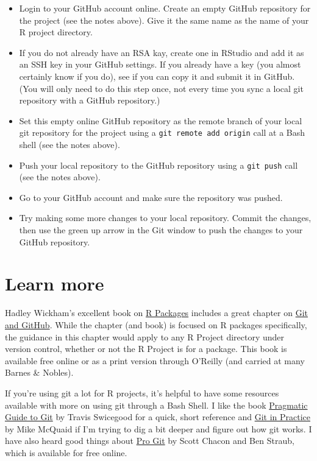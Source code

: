 \documentclass[]{tufte-book}
\providecommand{\tightlist}{%
  \setlength{\itemsep}{0pt}\setlength{\parskip}{0pt}}
\begin{document}
\begin{itemize}
\tightlist
\item
  Login to your GitHub account online. Create an empty GitHub repository for the
  project (see the notes above). Give it the same name as the name of your R project directory.
\item
  If you do not already have an RSA kay, create one in RStudio and add it as an
  SSH key in your GitHub settings. If you already have a key (you almost certainly
  know if you do), see if you can copy it and submit it in GitHub. (You will only need
  to do this step once, not every time you sync a local git repository with a GitHub
  repository.)
\item
  Set this empty online GitHub repository as the remote branch of your local git
  repository for the project using a \texttt{git\ remote\ add\ origin} call at a Bash shell
  (see the notes above).
\item
  Push your local repository to the GitHub repository using a \texttt{git\ push} call
  (see the notes above).
\item
  Go to your GitHub account and make sure the repository was pushed.
\item
  Try making some more changes to your local repository. Commit the changes,
  then use the green up arrow in the Git window to push the changes to your GitHub
  repository.
\end{itemize}

\hypertarget{learn-more-2}{%
\section{Learn more}\label{learn-more-2}}

Hadley Wickham's excellent book on \href{http://r-pkgs.had.co.nz/}{R Packages} includes a great
chapter on \href{http://r-pkgs.had.co.nz/git.html}{Git and GitHub}. While the chapter (and book) is
focused on R packages specifically, the guidance in this chapter would apply to any
R Project directory under version control, whether or not the R Project is for a package.
This book is available free online or as a print version through O'Reilly (and
carried at many Barnes \& Nobles).

If you're using git a lot for R projects, it's helpful to have some resources available with
more on using git through a Bash Shell. I like the book \href{https://www.amazon.com/Pragmatic-Guide-Git-Programmers/dp/1934356727/ref=sr_1_28?keywords=git\&qid=1554173700\&s=gateway\&sr=8-28}{Pragmatic Guide to Git} by Travis Swicegood for a quick, short reference and
\href{https://www.amazon.com/Git-Practice-Techniques-Mike-McQuaid/dp/1617291978/ref=sr_1_60?keywords=git\&qid=1554174811\&s=gateway\&sr=8-60}{Git in Practice} by Mike McQuaid if I'm trying to dig a bit deeper
and figure out how git works.
I have also heard good things about \href{https://git-scm.com/book/en/v2}{Pro Git} by Scott Chacon and
Ben Straub, which is available for free online.
\end{document}
